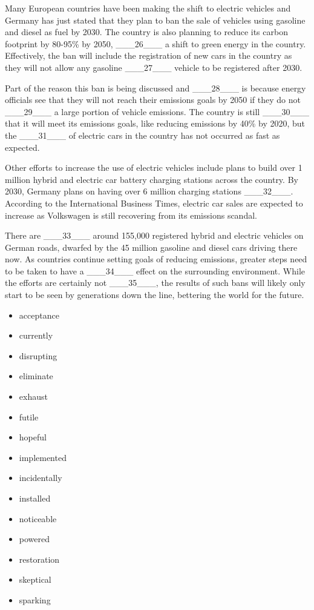 \documentclass[UTF8,11pt]{ctexart}
\begin{document}
Many European countries have been making the shift to electric vehicles and Germany has just stated that they plan to ban the sale of vehicles using gasoline and diesel as fuel by 2030. The country is also planning to reduce its carbon footprint by 80-95\% by 2050, \_\_\_26\_\_\_ a shift to green energy in the country. Effectively, the ban will include the registration of new cars in the country as they will not allow any gasoline \_\_\_27\_\_\_ vehicle to be registered after 2030.


Part of the reason this ban is being discussed and \_\_\_28\_\_\_ is because energy officials see that they will not reach their emissions goals by 2050 if they do not \_\_\_29\_\_\_ a large portion of vehicle emissions. The country is still \_\_\_30\_\_\_ that it will meet its emissions goals, like reducing emissions by 40\% by 2020, but the \_\_\_31\_\_\_ of electric cars in the country has not occurred as fast as expected.


Other efforts to increase the use of electric vehicles include plans to build over 1 million hybrid and electric car battery charging stations across the country. By 2030, Germany plans on having over 6 million charging stations \_\_\_32\_\_\_. According to the International Business Times, electric car sales are expected to increase as Volkswagen is still recovering from its emissions scandal.


There are \_\_\_33\_\_\_ around 155,000 registered hybrid and electric vehicles on German roads, dwarfed by the 45 million gasoline and diesel cars driving there now. As countries continue setting goals of reducing emissions, greater steps need to be taken to have a \_\_\_34\_\_\_ effect on the surrounding environment. While the efforts are certainly not \_\_\_35\_\_\_, the results of such bans will likely only start to be seen by generations down the line, bettering the world for the future.


\begin{itemize}[leftmargin=2em,itemsep=.2em,topsep=.4em]\item[A.] acceptance
\item[B.] currently
\item[C.] disrupting
\item[D.] eliminate
\item[E.] exhaust
\item[F.] futile
\item[G.] hopeful
\item[H.] implemented
\item[I.] incidentally
\item[J.] installed
\item[K.] noticeable
\item[L.] powered
\item[M.] restoration
\item[N.] skeptical
\item[O.] sparking
\end{itemize}
\end{document}
